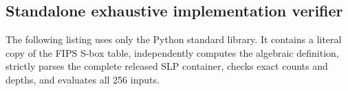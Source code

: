 \documentclass[11pt]{article}
\theoremstyle{definition}
\begin{document}
\subsection{Standalone exhaustive implementation verifier}

The following listing uses only the Python standard library.  It contains a literal copy of the FIPS
S-box table, independently computes the algebraic definition, strictly parses the complete released
SLP container, checks exact counts and depths, and evaluates all 256 inputs.



\printbibliography
\end{document}
